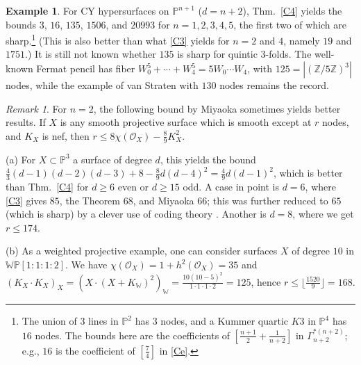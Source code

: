 \documentclass[12pt,letterpaper,english]{amsart}
\numberwithin{equation}{section}
\numberwithin{figure}{section}
\theoremstyle{plain}
\theoremstyle{remark}
\newtheorem{rem}[equation]{Remark}
\theoremstyle{definition}
\theoremstyle{definition}
\newtheorem{example}[equation]{Example}
\theoremstyle{plain}
\theoremstyle{plain}
\theoremstyle{plain}
\theoremstyle{plain}
\theoremstyle{definition}
\def\ZZ{\mathbb{Z}}
\def\PP{\mathbb{P}}
\def\co{\mathcal{O}}
\def\WW{\mathbb{W}}
\theoremstyle{definition}
\begin{document}
\begin{example}\label{C6}
For CY hypersurfaces on $\PP^{n+1}$ ($d=n+2$), Thm.~\ref{C4} yields the bounds $3$, $16$, $135$, $1506$, and $20993$ for $n=1,2,3,4,5$, the first two of which are sharp.\footnote{The union of $3$ lines in $\PP^2$ has $3$ nodes, and a Kummer quartic $K3$ in $\PP^4$ has $16$ nodes. The bounds here are the coefficients of $[\tfrac{n+1}{2}+\tfrac{1}{n+2}]$ in $\Gamma_{n+2}^{*(n+2)}$; e.g., $16$ is the coefficient of $[\tfrac{7}{4}]$ in \eqref{Ce}.} (This is also better than what \eqref{C3} yields for $n=2$ and $4$, namely $19$ and $1751$.) It is still not known whether $135$ is sharp for quintic $3$-folds. The well-known Fermat pencil has fiber $W_0^5+\cdots+W_4^5=5W_0\cdots W_4$, with $125=|(\ZZ/5\ZZ)^3|$ nodes, while the example of van Straten \cite{vS1} with $130$ nodes remains the record.	
\end{example}

\begin{rem}\label{C7}
For $n=2$, the following bound by Miyaoka \cite{Mi} sometimes yields better results. If $X$ is any smooth projective surface which is smooth except at $r$ nodes, and $K_X$ is nef, then $r\leq 8\chi(\co_X)-\tfrac{8}{9}K_X^2$.

(a) For $X\subset \PP^3$ a surface of degree $d$, this yields the bound $\frac{4}{3}(d-1)(d-2)(d-3)+8-\tfrac{8}{9}d(d-4)^2=\tfrac{4}{9}d(d-1)^2$, which is better than Thm.~\ref{C4} for $d\geq 6$ even or $d\geq 15$ odd. A case in point is $d=6$, where \eqref{C3} gives $85$, the Theorem $68$, and Miyaoka $66$; this was further reduced to $65$ (which is sharp) by a clever use of coding theory \cite{JR}. Another is $d=8$, where we get $r\leq 174$.

(b) As a weighted projective example, one can consider surfaces $X$ of degree $10$ in $\mathbb{WP}[1{:}1{:}1{:}2]$. We have $\chi(\co_X)=1+h^2(\co_X)=35$ and $(K_X\cdot K_X)_X=(X\cdot (X+K_{\WW})^2)_{\WW}=\tfrac{10(10-5)^2}{1\cdot 1\cdot 1\cdot 2}=125$, hence $r\leq \lfloor \tfrac{1520}{9}\rfloor =168$.
\end{rem}
\end{document}
